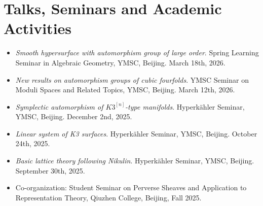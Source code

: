 \documentclass[11pt,a4paper]{article}
\newcommand{\datedentry}[2]{%
  \begin{tabularx}{\textwidth}{R L}
    #1 & #2 \\
  \end{tabularx}\vspace{1pt}
}
\begin{document}



\newpage
\section{Talks, Seminars and Academic Activities}

\begin{itemize}
    \item \textit{Smooth hypersurface with automorphism group of large order}. Spring Learning Seminar in Algebraic Geometry, YMSC, Beijing. March 18th, 2026.
    \item \textit{New results on automorphism groups of cubic fourfolds}. YMSC Seminar on Moduli Spaces and Related Topics, YMSC, Beijing. March 12th, 2026.
    \item \textit{Symplectic automorphism of $K3^{[n]}$-type manifolds}. Hyperkähler Seminar, YMSC, Beijing. December 2nd, 2025.
    \item \textit{Linear system of K3 surfaces}. Hyperkähler Seminar, YMSC, Beijing. October 24th, 2025.
    \item \textit{Basic lattice theory following Nikulin}. Hyperkähler Seminar, YMSC, Beijing. September 30th, 2025.
    \item Co-organization: Student Seminar on Perverse Sheaves and Application to Representation Theory, Qiuzhen College, Beijing, Fall 2025.
\end{itemize}
\end{document}

